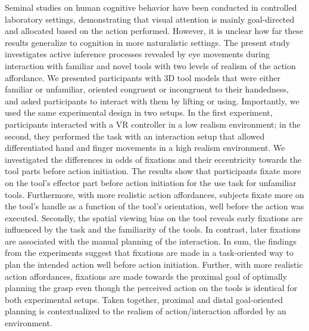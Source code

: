 Seminal studies on human cognitive behavior have been conducted in controlled laboratory settings, demonstrating that visual attention is mainly goal-directed and allocated based on the action performed. However, it is unclear how far these results generalize to cognition in more naturalistic settings. The present study investigates active inference processes revealed by eye movements during interaction with familiar and novel tools with two levels of realism of the action affordance. 
We presented participants with 3D tool models that were either familiar or unfamiliar, oriented congruent or incongruent to their handedness, and asked participants to interact with them by lifting or using. Importantly, we used the same experimental design in two setups. In the first experiment, participants interacted with a VR controller in a low realism environment; in the second, they performed the task with an interaction setup that allowed differentiated hand and finger movements in a high realism environment. We investigated the differences in odds of fixations and their eccentricity towards the tool parts before action initiation.
The results show that participants fixate more on the tool’s effector part before action initiation for the use task for unfamiliar tools. Furthermore, with more realistic action affordances, subjects fixate more on the tool’s handle as a function of the tool’s orientation, well before the action was executed. Secondly, the spatial viewing bias on the tool reveals early fixations are influenced by the task and the familiarity of the tools. In contrast, later fixations are associated with the manual planning of the interaction. 
In sum, the findings from the experiments suggest that fixations are made in a task-oriented way to plan the intended action well before action initiation. Further, with more realistic action affordances, fixations are made towards the proximal goal of optimally planning the grasp even though the perceived action on the tools is identical for both experimental setups. Taken together, proximal and distal goal-oriented planning is contextualized to the realism of action/interaction afforded by an environment.
